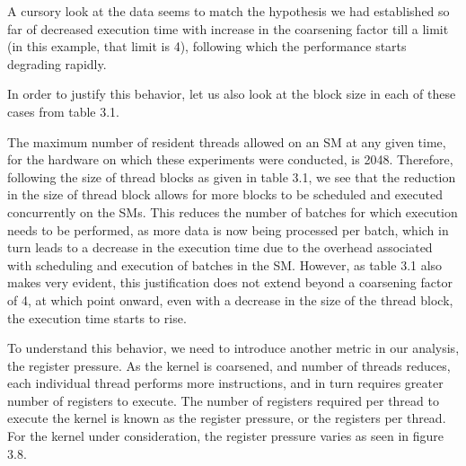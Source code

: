 A cursory look at the data seems to match the hypothesis we had established so far of decreased execution time with increase in the coarsening factor till a limit (in this example, that limit is 4), following which the performance starts degrading rapidly.

In order to justify this behavior, let us also look at the block size in each of these cases from table 3.1.

    

The maximum number of resident threads allowed on an SM at any given time, for the hardware on which these experiments were conducted, is 2048. Therefore, following the size of thread blocks as given in table 3.1, we see that the reduction in the size of thread block allows for more blocks to be scheduled and executed concurrently on the SMs. This reduces the number of batches for which execution needs to be performed, as more data is now being processed per batch, which in turn leads to a decrease in the execution time due to the overhead associated with scheduling and execution of batches in the SM. However, as table 3.1 also makes very evident, this justification does not extend beyond a coarsening factor of 4, at which point onward, even with a decrease in the size of the thread block, the execution time starts to rise.

To understand this behavior, we need to introduce another metric in our analysis, the register pressure. As the kernel is coarsened, and number of threads reduces, each individual thread performs more instructions, and in turn requires greater number of registers to execute. The number of registers required per thread to execute the kernel is known as the register pressure, or the registers per thread. For the kernel under consideration, the register pressure varies as seen in figure 3.8.

